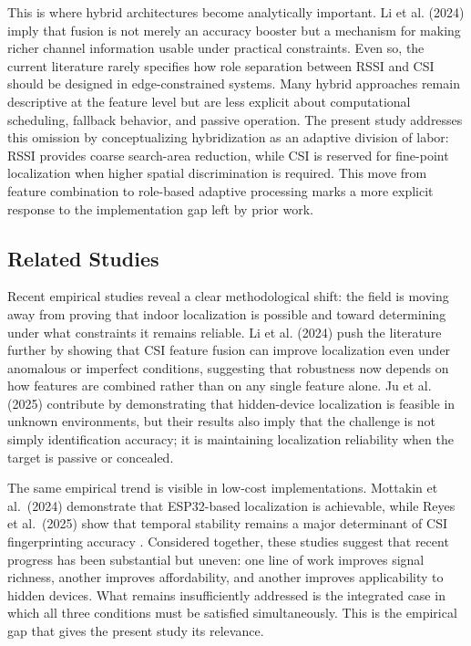 This is where hybrid architectures become analytically important. Li et al. (2024) imply that fusion is not merely an accuracy booster but a mechanism for making richer channel information usable under practical constraints. Even so, the current literature rarely specifies how role separation between RSSI and CSI should be designed in edge-constrained systems. Many hybrid approaches remain descriptive at the feature level but are less explicit about computational scheduling, fallback behavior, and passive operation. The present study addresses this omission by conceptualizing hybridization as an adaptive division of labor: RSSI provides coarse search-area reduction, while CSI is reserved for fine-point localization when higher spatial discrimination is required. This move from feature combination to role-based adaptive processing marks a more explicit response to the implementation gap left by prior work.

\subsection{Related Studies}
Recent empirical studies reveal a clear methodological shift: the field is moving away from proving that indoor localization is possible and toward determining under what constraints it remains reliable. Li et al. (2024) push the literature further by showing that CSI feature fusion can improve localization even under anomalous or imperfect conditions, suggesting that robustness now depends on how features are combined rather than on any single feature alone. Ju et al. (2025) contribute by demonstrating that hidden-device localization is feasible in unknown environments, but their results also imply that the challenge is not simply identification accuracy; it is maintaining localization reliability when the target is passive or concealed.

The same empirical trend is visible in low-cost implementations. Mottakin et al.\ (2024) demonstrate that ESP32-based localization is achievable, while Reyes et al.\ (2025) show that temporal stability remains a major determinant of CSI fingerprinting accuracy \cite{mottakin2024swiloc,reyes2025temporal}. Considered together, these studies suggest that recent progress has been substantial but uneven: one line of work improves signal richness, another improves affordability, and another improves applicability to hidden devices. What remains insufficiently addressed is the integrated case in which all three conditions must be satisfied simultaneously. This is the empirical gap that gives the present study its relevance.

